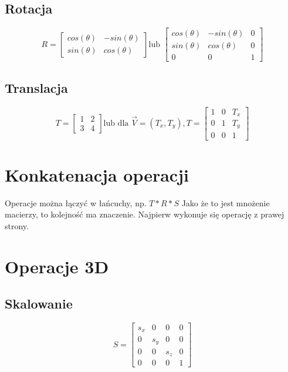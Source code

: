 \documentclass{../notatki}
\begin{document}
\subsection{Rotacja}

$$
R =
\begin{bmatrix}
  cos(\theta) & -sin(\theta) \\
  sin(\theta) & cos(\theta)
\end{bmatrix}
\text{lub }
\begin{bmatrix} cos(\theta) & -sin(\theta) & 0 \\ sin(\theta) &
  cos(\theta) & 0 \\ 0 & 0 & 1
\end{bmatrix}
$$

\subsection{Translacja}

$$
T =
\begin{bmatrix}
  1 & 2 \\
  3 & 4
\end{bmatrix}
\text{lub dla }
\vec{V}=(T_x, T_y),
T=
\begin{bmatrix} 1 & 0 & T_x \\ 0 & 1 & T_y \\ 0 & 0 & 1
\end{bmatrix}
$$

\section{Konkatenacja operacji}

Operacje można łączyć w łańcuchy, np. $T * R * S$
Jako że to jest mnożenie macierzy, to kolejność ma znaczenie.
Najpierw wykonuje się operację z prawej strony.

\section{Operacje 3D}

\subsection{Skalowanie}

$$
S =
\begin{bmatrix} s_x & 0 & 0 & 0 \\ 0 & s_y & 0 & 0 \\ 0 & 0 & s_z & 0
  \\ 0 & 0 & 0 & 1
\end{bmatrix}
$$
\end{document}
